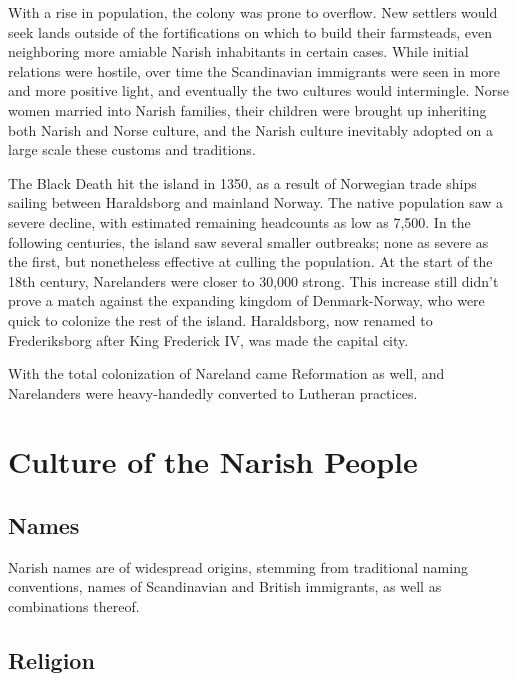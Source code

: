 \documentclass[a4paper,11pt,twoside,openright]{memoir}
\begin{document}
With a rise in population, the colony was prone to overflow. New settlers would seek lands outside of the fortifications on which to build their farmsteads, even neighboring more amiable Narish inhabitants in certain cases. While initial relations were hostile, over time the Scandinavian immigrants were seen in more and more positive light, and eventually the two cultures would intermingle. Norse women married into Narish families, their children were brought up inheriting both Narish and Norse culture, and the Narish culture inevitably adopted on a large scale these customs and traditions.

The Black Death hit the island in 1350, as a result of Norwegian trade ships sailing between Haraldsborg and mainland Norway. The native population saw a severe decline, with estimated remaining headcounts as low as 7,500. In the following centuries, the island saw several smaller outbreaks; none as severe as the first, but nonetheless effective at culling the population. At the start of the 18th century, Narelanders were closer to 30,000 strong.
This increase still didn't prove a match against the expanding kingdom of Denmark-Norway, who were quick to colonize the rest of the island. Haraldsborg, now renamed to Frederiksborg after King Frederick IV, was made the capital city.

With the total colonization of Nareland came Reformation as well, and Narelanders were heavy-handedly converted to Lutheran practices. 

\part{Culture of the Narish People}

\chapter{Names}

Narish names are of widespread origins, stemming from traditional naming conventions, names of Scandinavian and British immigrants, as well as combinations thereof.

\chapter{Religion}
\end{document}
